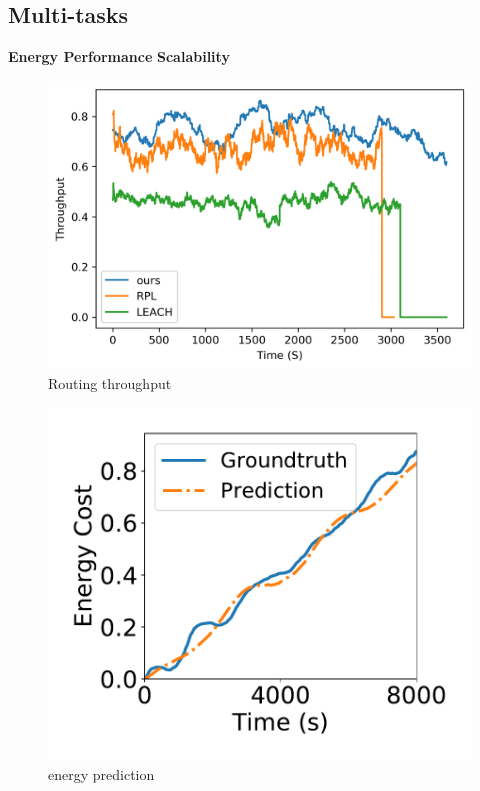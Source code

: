 \subsection{Multi-tasks}
\textbf{Energy Performance}
\textbf{Scalability}
\begin{figure}[htbp]
	\centering
	\includegraphics[width=.85\columnwidth]{Figure/throughput}
	\vspace{-0.1in}
	\caption{Routing throughput}
	\label{throughtput}
	\vspace{-0.2in}
\end{figure}
\begin{figure}[htbp]
	\centering
	\includegraphics[width=.85\columnwidth]{Figure/energy_pred}
	\vspace{-0.1in}
	\caption{energy prediction}
	\label{energy_pred}
	\vspace{-0.2in}
\end{figure}

